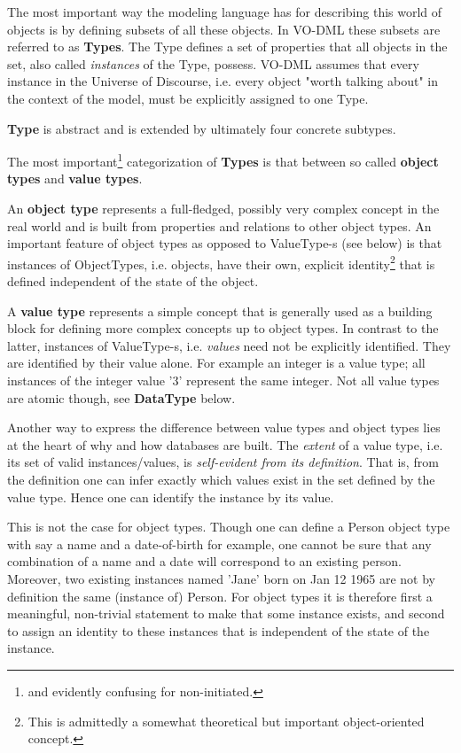 \documentclass[10pt,a4paper]{ivoa}
\begin{document}
The most important way the modeling language has for describing this
world of objects is by defining subsets of all these objects. In VO-DML
these subsets are referred to as \textbf{Types}. The Type defines a set
of properties that all objects in the set, also called \emph{instances}
of the Type, possess. VO-DML assumes that every instance in the Universe
of Discourse, i.e. every object "worth talking about" in the context of
the model, must be explicitly assigned to one Type.

\textbf{Type} is abstract and is extended by ultimately four concrete
subtypes.

The most important\footnote{and evidently confusing for non-initiated.}
categorization of \textbf{Types} is that between so called
\textbf{object types} and \textbf{value types}.

An \textbf{object type} represents a full-fledged, possibly very complex
concept in the real world and is built from properties and relations to
other object types. An important feature of object types as opposed to
ValueType-s (see below) is that instances of ObjectTypes, i.e. objects,
have their own, explicit identity\footnote{This is admittedly a somewhat
  theoretical but important object-oriented concept.} that is defined
independent of the state of the object.

A \textbf{value type} represents a simple concept that is generally used
as a building block for defining more complex concepts up to object
types. In contrast to the latter, instances of ValueType-s, i.e.
\emph{values} need not be explicitly identified. They are identified by
their value alone. For example an integer is a value type; all instances
of the integer value '3' represent the same integer. Not all value types
are atomic though, see \textbf{DataType} below.

Another way to express the difference between value types and object
types lies at the heart of why and how databases are built. The
\emph{extent} of a value type, i.e. its set of valid instances/values,
is \emph{self-evident from its definition}. That is, from the definition
one can infer exactly which values exist in the set defined by the value
type. Hence one can identify the instance by its value.

This is not the case for object types. Though one can define a Person
object type with say a name and a date-of-birth for example, one cannot
be sure that any combination of a name and a date will correspond to an
existing person. Moreover, two existing instances named 'Jane' born on
Jan 12 1965 are not by definition the same (instance of) Person. For
object types it is therefore first a meaningful, non-trivial statement
to make that some instance exists, and second to assign an identity to
these instances that is independent of the state of the instance.
\end{document}
